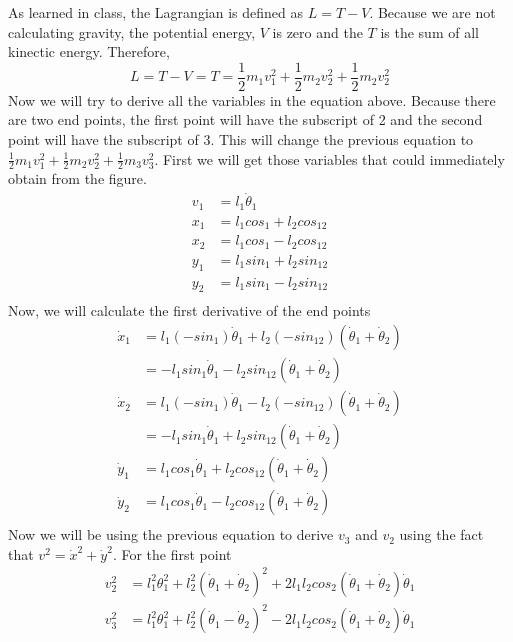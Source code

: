 As learned in class, the Lagrangian is defined as $L = T - V$. Because we are not calculating gravity, the potential energy, $V$ is zero and the $T$ is the sum of all kinectic energy. Therefore,
\begin{equation}
L = T - V = T = \frac{1}{2} m_1 v_1^2 + \frac{1}{2} m_2 v_2^2 + \frac{1}{2} m_2 v_2^2
\end{equation}
Now we will try to derive all the variables in the equation above. Because there are two end points, the first point will have the subscript of 2 and the second point will have the subscript of 3. This will change the previous equation to $\frac{1}{2} m_1 v_1^2 + \frac{1}{2} m_2 v_2^2 + \frac{1}{2} m_3 v_3^2$. First we will get those variables that could immediately obtain from the figure.
\begin{equation}
\begin{aligned}
v_1 &= l_1 \dot{\theta}_1\\
x_1 &= l_1 cos_1 + l_2 cos_{12}\\
x_2 &= l_1 cos_1 - l_2 cos_{12}\\
y_1 &= l_1 sin_1 + l_2 sin_{12}\\
y_2 &= l_1 sin_1 - l_2 sin_{12}\\
\end{aligned}
\end{equation}
Now, we will calculate the first derivative of the end points
\begin{equation}
\begin{aligned}
\dot{x}_1 &= l_1(-sin_1)\dot{\theta}_1 + l_2(-sin_{12})(\dot{\theta}_1 + \dot{\theta}_2)\\
&= -l_1 sin_1 \dot{\theta}_1 - l_2 sin_{12}(\dot{\theta}_1 + \dot{\theta}_2)\\
\dot{x}_2 &= l_1(-sin_1)\dot{\theta}_1 - l_2(-sin_{12})(\dot{\theta}_1 + \dot{\theta}_2)\\
&= -l_1 sin_1 \dot{\theta}_1 + l_2 sin_{12}(\dot{\theta}_1 + \dot{\theta}_2)\\
\dot{y}_1 &= l_1 cos_1 \dot{\theta}_1 + l_2 cos_{12}(\dot{\theta}_1 + \dot{\theta}_2)\\
\dot{y}_2 &= l_1 cos_1 \dot{\theta}_1 - l_2 cos_{12}(\dot{\theta}_1 + \dot{\theta}_2)\\
\end{aligned}
\end{equation}
Now we will be using the previous equation to derive $v_3$ and $v_2$ using the fact that $v^2 = \dot{x}^2 + \dot{y}^2$. For the first point
\begin{equation}
\begin{aligned}
v_2^2 &= l_1^2\theta_1^2 + l_2^2(\dot{\theta}_1 + \dot{\theta}_2)^2 + 2 l_1 l_2 cos_2 (\dot{\theta}_1 + \dot{\theta}_2) \dot{\theta}_1\\
v_3^2 &= l_1^2\theta_1^2 + l_2^2(\dot{\theta}_1 - \dot{\theta}_2)^2 - 2 l_1 l_2 cos_2 (\dot{\theta}_1 + \dot{\theta}_2) \dot{\theta}_1\\
\end{aligned}
\end{equation}
